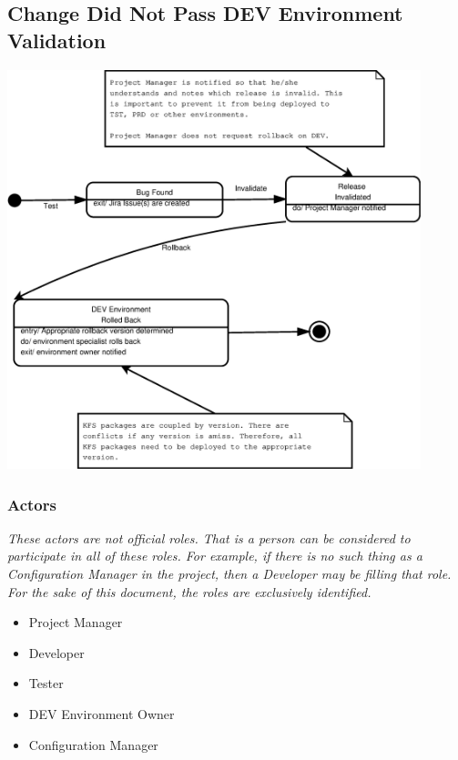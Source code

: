 \documentclass[12pt,notitlepage]{article}
\begin{document}
\subsection{Change Did Not Pass DEV Environment Validation}
\includegraphics[width=12cm]{Diagrams/ChangePromotion_State5.eps}
\subsubsection{Actors}
\emph{These actors are not official roles. That is a person can be considered to
participate in all of these roles. For example, if there is no such thing as a Configuration
Manager in the project, then a Developer may be filling that role. For the sake of
this document, the roles are exclusively identified.}
\begin{itemize}
  \item Project Manager
  \item Developer
  \item Tester
  \item DEV Environment Owner
  \item Configuration Manager
\end{itemize}
\end{document}
